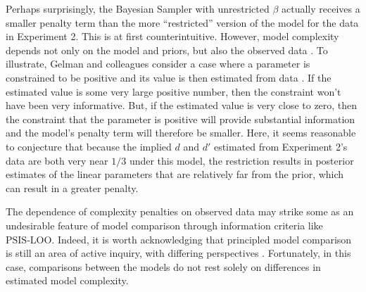 \documentclass[
  english,
  man,floatsintext]{apa6}
\begin{document}
Perhaps surprisingly, the Bayesian Sampler with unrestricted \(\beta\) actually receives a smaller penalty term than the more ``restricted'' version of the model for the data in Experiment 2. This is at first counterintuitive. However, model complexity depends not only on the model and priors, but also the observed data \autocite[see][]{gelman.etal2014}. To illustrate, Gelman and colleagues consider a case where a parameter is constrained to be positive and its value is then estimated from data \autocite*{gelman.etal2014}. If the estimated value is some very large positive number, then the constraint won't have been very informative. But, if the estimated value is very close to zero, then the constraint that the parameter is positive will provide substantial information and the model's penalty term will therefore be smaller. Here, it seems reasonable to conjecture that because the implied \(d\) and \(d'\) estimated from Experiment 2's data are both very near \(1/3\) under this model, the restriction results in posterior estimates of the linear parameters that are relatively far from the prior, which can result in a greater penalty.

The dependence of complexity penalties on observed data may strike some as an undesirable feature of model comparison through information criteria like \(\text{PSIS-LOO}\). Indeed, it is worth acknowledging that principled model comparison is still an area of active inquiry, with differing perspectives \autocites[e.g.][]{gronau.wagenmakers2019,vehtari.etal2019}. Fortunately, in this case, comparisons between the models do not rest solely on differences in estimated model complexity.
\end{document}
